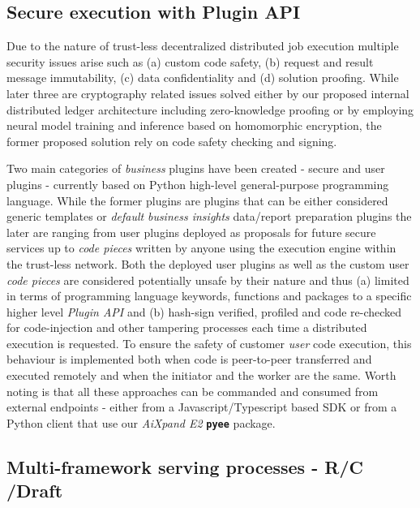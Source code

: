 \documentclass{article}
\begin{document}
\subsection{Secure execution with Plugin API}

Due to the nature of trust-less decentralized distributed job execution multiple security issues arise such as (a) custom code safety, (b) request and result message immutability, (c) data confidentiality and (d) solution proofing. While later three are cryptography related issues solved either by our proposed internal distributed ledger architecture including zero-knowledge proofing or by employing neural model training and inference based on homomorphic encryption, the former proposed solution rely on code safety checking and signing.

Two main categories of \emph{business} plugins have been created - secure and user plugins - currently based on Python\cite{vanrossum1995python} high-level general-purpose programming language. While the former plugins are plugins that can be either considered generic templates or \emph{default} \emph{business insights} data/report preparation plugins the later are ranging from user plugins deployed as proposals for future secure services up to \emph{code pieces} written by anyone using the execution engine within the trust-less network. Both the deployed user plugins as well as the custom user \emph{code pieces} are considered potentially unsafe by their nature and thus (a) limited in terms of programming language keywords, functions and packages to a specific higher level \emph{Plugin API} and (b) hash-sign verified, profiled and code re-checked for code-injection and other tampering processes each time a distributed execution is requested. To ensure the safety of customer \emph{user} code execution, this behaviour is implemented both when code is peer-to-peer transferred and executed remotely and when the initiator and the worker are the same.
Worth noting is that all these approaches can be commanded and consumed from external endpoints - either from a Javascript/Typescript based SDK or from a Python client that use our \textit{AiXpand E2} \texttt{\textbf{pyee}} package.

\subsection{Multi-framework serving processes - R/C /Draft}
\end{document}

